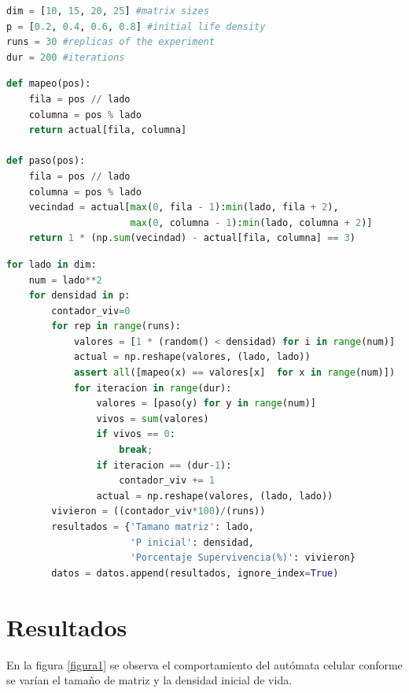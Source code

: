 \documentclass{article}
\begin{document}
\begin{lstlisting}[caption=Par\'ametros, label=codigo1, captionpos=b, language=Python]
dim = [10, 15, 20, 25] #matrix sizes
p = [0.2, 0.4, 0.6, 0.8] #initial life density
runs = 30 #replicas of the experiment
dur = 200 #iterations
\end{lstlisting}

\begin{lstlisting}[caption=Funciones, label=codigo2, captionpos=b, language=Python]
def mapeo(pos):
    fila = pos // lado
    columna = pos % lado
    return actual[fila, columna]

def paso(pos):
    fila = pos // lado
    columna = pos % lado
    vecindad = actual[max(0, fila - 1):min(lado, fila + 2),
                      max(0, columna - 1):min(lado, columna + 2)]
    return 1 * (np.sum(vecindad) - actual[fila, columna] == 3)

\end{lstlisting}

\newpage

\begin{lstlisting}[caption=Iteraci\'on de Par\'ametros, label=codigo3, captionpos=b, language=Python]
for lado in dim:
    num = lado**2
    for densidad in p:
        contador_viv=0
        for rep in range(runs):
            valores = [1 * (random() < densidad) for i in range(num)]
            actual = np.reshape(valores, (lado, lado))
            assert all([mapeo(x) == valores[x]  for x in range(num)])
            for iteracion in range(dur):
                valores = [paso(y) for y in range(num)]
                vivos = sum(valores)
                if vivos == 0:
                    break;
                if iteracion == (dur-1):
                    contador_viv += 1
                actual = np.reshape(valores, (lado, lado))
        vivieron = ((contador_viv*100)/(runs))
        resultados = {'Tamano matriz': lado,
                      'P inicial': densidad,
                      'Porcentaje Supervivencia(%)': vivieron}
        datos = datos.append(resultados, ignore_index=True)
\end{lstlisting}

\section{Resultados}
En la figura \ref{figura1} se observa el comportamiento del aut\'omata celular conforme se var\'ian el tamaño de matriz y la densidad inicial de vida.
\end{document}
